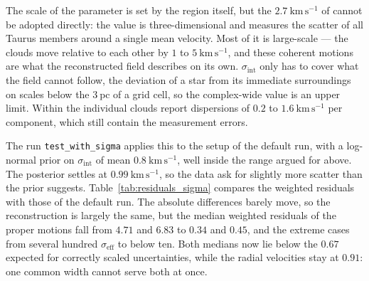 The scale of the parameter is set by the region itself, but the $2.7~\mathrm{km\,s^{-1}}$ of
\citet{Galli2019} cannot be adopted directly: the value is three-dimensional and measures the
scatter of all Taurus members around a single mean velocity. Most of it is large-scale --- the
clouds move relative to each other by $1$ to $5~\mathrm{km\,s^{-1}}$, and these coherent motions
are what the reconstructed field describes on its own. $\sigma_\mathrm{int}$ only has to cover what
the field cannot follow, the deviation of a star from its immediate surroundings on scales below
the $3~\mathrm{pc}$ of a grid cell, so the complex-wide value is an upper limit. Within the
individual clouds \citet{Galli2019} report dispersions of $0.2$ to $1.6~\mathrm{km\,s^{-1}}$ per
component, which still contain the measurement errors.

The run \texttt{test\_with\_sigma} applies this to the setup of the default run, with a log-normal prior on
$\sigma_\mathrm{int}$ of mean $0.8~\mathrm{km\,s^{-1}}$, well inside the range argued for above. The
posterior settles at $0.99~\mathrm{km\,s^{-1}}$, so the data ask for slightly more scatter than the prior
suggests. Table~\ref{tab:residuals_sigma} compares the weighted residuals with those of the default run.
The absolute differences barely move, so the reconstruction is largely the same, but the median weighted
residuals of the proper motions fall from $4.71$ and $6.83$ to $0.34$ and $0.45$, and the extreme cases
from several hundred $\sigma_\mathrm{eff}$ to below ten. Both medians now lie below the $0.67$ expected
for correctly scaled uncertainties, while the radial velocities stay at $0.91$: one common width cannot
serve both at once.

